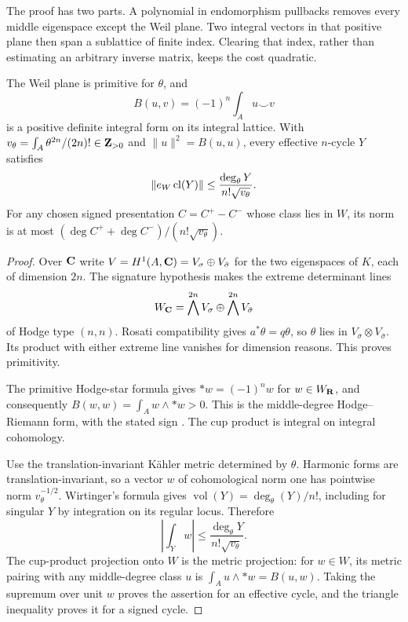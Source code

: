 The proof has two parts. A polynomial in endomorphism pullbacks removes every middle eigenspace except the Weil plane. Two integral vectors in that positive plane then span a sublattice of finite index. Clearing that index, rather than estimating an arbitrary inverse matrix, keeps the cost quadratic.

\begin{lemma}\label{lem:weil-norm}
The Weil plane is primitive for $\theta$, and
\[
 B(u,v)=(-1)^n\int_Au\smile v
\]
is a positive definite integral form on its integral lattice. With
$v_\theta=\int_A\theta^{2n}/(2n)!\in\mathbf Z_{>0}$ and
$\|u\|^2=B(u,u)$, every effective $n$-cycle $Y$ satisfies
\[
 \|e_W\operatorname{cl}(Y)\|\leq\frac{\deg_\theta Y}{n!\sqrt{v_\theta}}.
\]
For any chosen signed presentation $C=C^+-C^-$ whose class lies in $W$, its norm is at most
$(\deg C^++\deg C^-)/(n!\sqrt{v_\theta})$.
\end{lemma}

\begin{proof}
Over $\mathbf C$ write $V=H^1(A,\mathbf C)=V_\sigma\oplus V_{\bar\sigma}$ for the two eigenspaces of $K$, each of dimension $2n$. The signature hypothesis makes the extreme determinant lines
\[
 W_\mathbf C=\bigwedge^{2n}V_\sigma\oplus\bigwedge^{2n}V_{\bar\sigma}
\]
of Hodge type $(n,n)$. Rosati compatibility gives $a^*\theta=q\theta$, so $\theta$ lies in $V_\sigma\otimes V_{\bar\sigma}$. Its product with either extreme line vanishes for dimension reasons. This proves primitivity.

The primitive Hodge-star formula gives $*w=(-1)^nw$ for $w\in W_\mathbf R$, and consequently $B(w,w)=\int_A w\wedge*w>0$. This is the middle-degree Hodge--Riemann form, with the stated sign \cite[Theorem~5.42 and (5.43)]{Ballmann}. The cup product is integral on integral cohomology.

Use the translation-invariant K\"ahler metric determined by $\theta$. Harmonic forms are translation-invariant, so a vector $w$ of cohomological norm one has pointwise norm $v_\theta^{-1/2}$. Wirtinger's formula gives $\operatorname{vol}(Y)=\deg_\theta(Y)/n!$, including for singular $Y$ by integration on its regular locus. Therefore
\[
 \left|\int_Yw\right|\leq\frac{\deg_\theta Y}{n!\sqrt{v_\theta}}.
\]
The cup-product projection onto $W$ is the metric projection: for $w\in W$, its metric pairing with any middle-degree class $u$ is $\int_Au\wedge*w=B(u,w)$. Taking the supremum over unit $w$ proves the assertion for an effective cycle, and the triangle inequality proves it for a signed cycle.
\end{proof}

